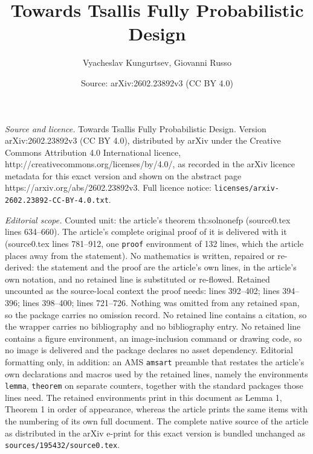 \documentclass[10pt,a4paper]{amsart}
\title{Towards Tsallis Fully Probabilistic Design}
\author{Vyacheslav Kungurtsev, Giovanni Russo}
\date{Source: arXiv:2602.23892v3 (CC BY 4.0)}
\begin{document}
\maketitle

\noindent\emph{Source and licence.} Towards Tsallis Fully Probabilistic Design. Version arXiv:2602.23892v3 (CC BY 4.0), distributed by arXiv under the Creative Commons Attribution 4.0 International licence, http://creativecommons.org/licenses/by/4.0/, as recorded in the arXiv licence metadata for this exact version and shown on the abstract page https://arxiv.org/abs/2602.23892v3. Full licence notice: \texttt{licenses/arxiv-2602.23892-CC-BY-4.0.txt}.\par\smallskip

\noindent\textit{Editorial scope.} Counted unit: the article's theorem th:solnonefp (source0.tex lines 634--660). The article's complete original proof of it is delivered with it (source0.tex lines 781--912, one \texttt{proof} environment of 132 lines, which the article places away from the statement). No mathematics is written, repaired or re-derived: the statement and the proof are the article's own lines, in the article's own notation, and no retained line is substituted or re-flowed.  Retained uncounted as the source-local context the proof needs: lines 392--402; lines 394--396; lines 398--400; lines 721--726.  Nothing was omitted from any retained span, so the package carries no omission record.  No retained line contains a citation, so the wrapper carries no bibliography and no bibliography entry.  No retained line contains a figure environment, an image-inclusion command or drawing code, so no image is delivered and the package declares no asset dependency.  Editorial formatting only, in addition: an AMS \texttt{amsart} preamble that restates the article's own declarations and macros used by the retained lines, namely the environments \texttt{lemma}, \texttt{theorem} on separate counters, together with the standard packages those lines need.  The retained environments print in this document as Lemma 1, Theorem 1 in order of appearance, whereas the article prints the same items with the numbering of its own full document.  The complete native source of the article as distributed in the arXiv e-print for this exact version is bundled unchanged as \texttt{sources/195432/source0.tex}.
\end{document}
